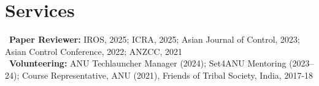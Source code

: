 \section*{Services}
\textbullet~\textbf{Paper Reviewer:} IROS, 2025; ICRA, 2025; Asian Journal of Control, 2023; Asian Control Conference, 2022; ANZCC, 2021\\[0.5em]
\textbullet~\textbf{Volunteering:} ANU Techlauncher Manager (2024); Set4ANU Mentoring (2023--24); Course Representative, ANU (2021), Friends of Tribal Society, India, 2017-18